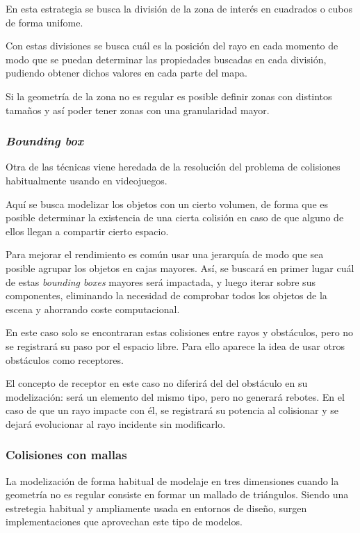 En esta estrategia se busca la división de la zona de interés en cuadrados o cubos de forma unifome.

Con estas divisiones se busca cuál es la posición del rayo en cada momento de modo que se puedan determinar las propiedades buscadas en cada división, pudiendo obtener dichos valores en cada parte del mapa.

Si la geometría de la zona no es regular es posible definir zonas con distintos tamaños y así poder tener zonas con una granularidad mayor.

\subsubsection*{\textit{Bounding box}}

Otra de las técnicas viene heredada de la resolución del problema de colisiones habitualmente usando en videojuegos.

Aquí se busca modelizar los objetos con un cierto volumen, de forma que es posible determinar la existencia de una cierta colisión en caso de que alguno de ellos llegan a compartir cierto espacio.

Para mejorar el rendimiento es común usar una jerarquía de modo que sea posible agrupar los objetos en cajas mayores.
Así, se buscará en primer lugar cuál de estas \textit{bounding boxes} mayores será impactada, y luego iterar sobre sus componentes, eliminando la necesidad de comprobar todos los objetos de la escena y ahorrando coste computacional.

En este caso solo se encontraran estas colisiones entre rayos y obstáculos, pero no se registrará su paso por el espacio libre.
Para ello aparece la idea de usar otros obstáculos como receptores.

El concepto de receptor en este caso no diferirá del del obstáculo en su modelización: será un elemento del mismo tipo, pero no generará rebotes.
En el caso de que un rayo impacte con él, se registrará su potencia al colisionar y se dejará evolucionar al rayo incidente sin modificarlo.

\subsubsection*{Colisiones con mallas}

La modelización de forma habitual de modelaje en tres dimensiones cuando la geometría no es regular consiste en formar un mallado de triángulos.
Siendo una estretegia habitual y ampliamente usada en entornos de diseño, surgen implementaciones que aprovechan este tipo de modelos.

